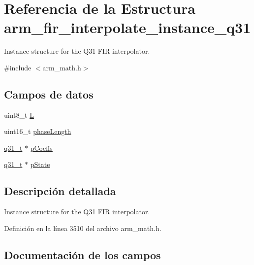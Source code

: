 \hypertarget{structarm__fir__interpolate__instance__q31}{}\section{Referencia de la Estructura arm\+\_\+fir\+\_\+interpolate\+\_\+instance\+\_\+q31}
\label{structarm__fir__interpolate__instance__q31}


Instance structure for the Q31 F\+IR interpolator.  




{\ttfamily \#include $<$arm\+\_\+math.\+h$>$}

\subsection*{Campos de datos}
\begin{DoxyCompactItemize}
\item 
uint8\+\_\+t \hyperlink{structarm__fir__interpolate__instance__q31_aee73cc056696e504430c53eaa9c58cf0}{L}
\item 
uint16\+\_\+t \hyperlink{structarm__fir__interpolate__instance__q31_a8f92bb07e0812f94679438cdf412b26a}{phase\+Length}
\item 
\hyperlink{arm__math_8h_adc89a3547f5324b7b3b95adec3806bc0}{q31\+\_\+t} $\ast$ \hyperlink{structarm__fir__interpolate__instance__q31_a68888e36167d81cb7836db10367a1682}{p\+Coeffs}
\item 
\hyperlink{arm__math_8h_adc89a3547f5324b7b3b95adec3806bc0}{q31\+\_\+t} $\ast$ \hyperlink{structarm__fir__interpolate__instance__q31_adee4ba3ee8869865af7d8fa08ca913d6}{p\+State}
\end{DoxyCompactItemize}


\subsection{Descripción detallada}
Instance structure for the Q31 F\+IR interpolator. 

Definición en la línea 3510 del archivo arm\+\_\+math.\+h.



\subsection{Documentación de los campos}
